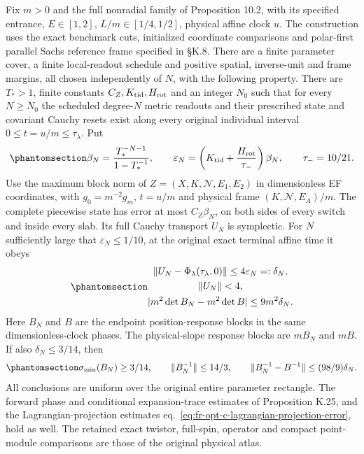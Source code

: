 \documentclass[
  english,
  11pt,
  reqno]{amsart}
\begin{document}
Fix \(m>0\) and the full nonradial family of Proposition 10.2, with its
specified entrance, \(E\in[1,2]\), \(L/m\in[1/4,1/2]\), physical affine
clock \(u\). The construction uses the exact benchmark cuts, initialized
coordinate comparisons and polar-first parallel Sachs reference frame
specified in §K.8. There are a finite parameter cover, a finite
local-readout schedule and positive spatial, inverse-unit and frame
margins, all chosen independently of \(N\), with the following property.
There are \(T_*>1\), finite constants \(C_Z,K_{\rm tid},H_{\rm rot}\)
and an integer \(N_0\) such that for every \(N\ge N_0\) the scheduled
degree-\(N\) metric readouts and their prescribed state and covariant
Cauchy resets exist along every original individual interval
\(0\le t=u/m\le\tau_\lambda\). Put
\begin{equation}\protect\phantomsection\label{eq:fro-main-effective-error}{
 \beta_N=\frac{T_*^{-N-1}}{1-T_*^{-1}},\qquad
 \varepsilon_N=\left(K_{\rm tid}+\frac{H_{\rm rot}}{\tau_-}\right)\beta_N,
 \qquad \tau_-=10/21.
}\end{equation} Use the maximum block norm of
\(Z=(X,K,\mathcal N,E_1,E_2)\) in dimensionless EF coordinates, with
\(g_0=m^{-2}g_m\), \(t=u/m\) and physical frame
\((K,\mathcal N,E_A)/m\). The complete piecewise state has error at most
\(C_Z\beta_N\), on both sides of every switch and inside every slab. Its
full Cauchy transport \(U_N\) is symplectic. For \(N\) sufficiently
large that \(\varepsilon_N\le1/10\), at the original exact terminal
affine time it obeys
\begin{equation}\protect\phantomsection\label{eq:fro-main-full-family-estimates}{\begin{gathered}
\|U_N-\Phi_\lambda(\tau_\lambda,0)\|
 \le4\varepsilon_N=:\delta_N, \\
\|U_N\|<4, \\
|m^2\det B_N-m^2\det B|\le9m^2\delta_N.
\end{gathered}}\end{equation} Here \(B_N\) and \(B\) are the endpoint
position-response blocks in the same dimensionless-clock phases. The
physical-slope response blocks are \(mB_N\) and \(mB\). If also
\(\delta_N\le3/14\), then
\begin{equation}\protect\phantomsection\label{eq:fro-main-full-family-inverses}{
 \sigma_{\min}(B_N)\ge3/14,\qquad
 \|B_N^{-1}\|\le14/3,\qquad
 \|B_N^{-1}-B^{-1}\|\le(98/9)\delta_N.
}\end{equation} All conclusions are uniform over the original entire
parameter rectangle. The forward phase and conditional expansion-trace
estimates of Proposition K.25, and the Lagrangian-projection estimates
eq.~\ref{eq:fr-opt-c-lagrangian-projection-error}, hold as well. The
retained exact twistor, full-spin, operator and compact point-module
comparisons are those of the original physical atlas.
\end{document}
